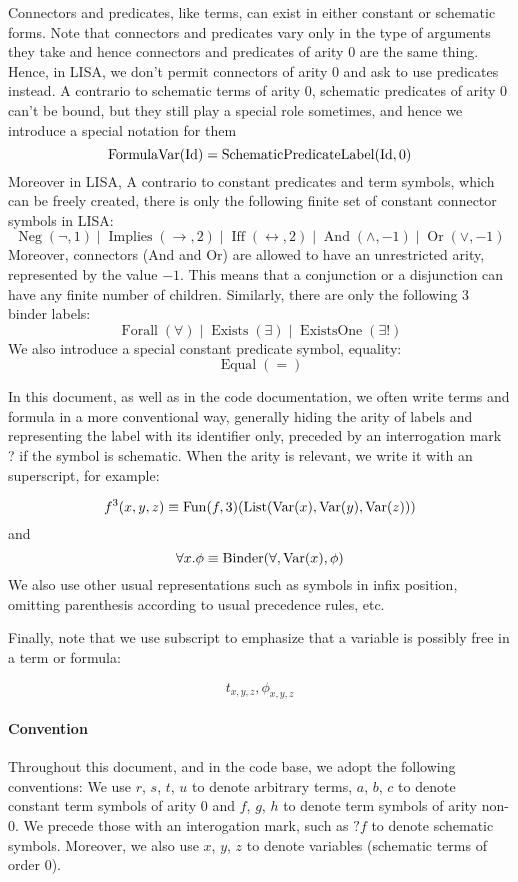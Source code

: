 \begin{defin}[Formulas]
Connectors and predicates, like terms, can exist in either constant or schematic forms. Note that connectors and predicates vary only in the type of arguments they take and hence connectors and predicates of arity 0 are the same thing. Hence, in LISA, we don't permit connectors of arity 0 and ask to use predicates instead.
A contrario to schematic terms of arity 0, schematic predicates of arity 0 can't be bound, but they still play a special role sometimes, and hence we introduce a special notation for them
$$
\operatorname{FormulaVar}(\textnormal{Id}) = \operatorname{SchematicPredicateLabel}(\textnormal{Id}, 0)
$$
Moreover in LISA, A contrario to constant predicates and term symbols, which can be freely created, there is only the following finite set of constant connector symbols in LISA:
$$
\operatorname{Neg}(\neg, 1)\mid \operatorname{Implies}(\rightarrow, 2)\mid \operatorname{Iff}(\leftrightarrow, 2)\mid \operatorname{And}(\land, -1)\mid \operatorname{Or}(\lor, -1)
$$
Moreover, connectors (And and Or) are allowed to have an unrestricted arity, represented by the value $-1$. This means that a conjunction or a disjunction can have any finite number of children. 
Similarly, there are only the following 3 binder labels:
$$
\operatorname{Forall}(\forall)\mid \operatorname{Exists}(\exists)\mid \operatorname{ExistsOne}(\exists !)
$$
We also introduce a special constant predicate symbol, equality:
$$
\operatorname{Equal}(=)
$$
\end{defin}


In this document, as well as in the code documentation, we often write terms and formula in a more conventional way, generally hiding the arity of labels and representing the label with its identifier only, preceded by an interrogation mark ? if the symbol is schematic. When the arity is relevant, we write it with an superscript, for example:

$$
f^3(x,y,z) \equiv \operatorname{Fun}(f, 3)(\operatorname{List}(\operatorname{Var}(x), \operatorname{Var}(y), \operatorname{Var}(z)))
$$
and
$$
\forall x. \phi \equiv \operatorname{Binder}(\forall, \operatorname{Var}(x), \phi)
$$
We also use other usual representations such as symbols in infix position, omitting parenthesis according to usual precedence rules, etc.

Finally, note that we use subscript to emphasize that a variable is possibly free in a term or formula:

$$
t_{x,y,z}, \phi_{x,y,z}
$$


\paragraph{Convention} Throughout this document, and in the code base, we adopt the following conventions: We use $r$, $s$, $t$, $u$ to denote arbitrary terms, $a$, $b$, $c$ to denote constant term symbols of arity $0$ and $f$, $g$, $h$ to denote term symbols of arity non-$0$. We precede those with an interogation mark, such as $?f$ to denote schematic symbols. Moreover, we also use $x$, $y$, $z$ to denote variables (schematic terms of order $0$).

